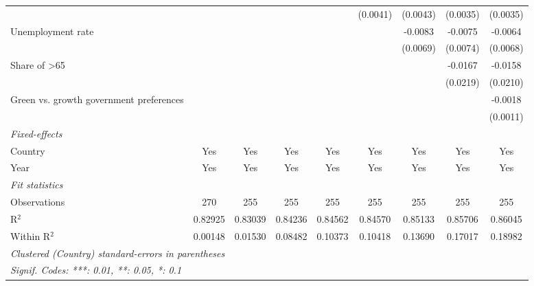\begin{table}[htbp]
\begin{tabular}{lcccccccc}
                                                                 &          &          &          &               & (0.0041)      & (0.0043)      & (0.0035)       & (0.0035)\\   
      Unemployment rate                                          &          &          &          &               &               & -0.0083       & -0.0075        & -0.0064\\   
                                                                 &          &          &          &               &               & (0.0069)      & (0.0074)       & (0.0068)\\   
      Share of >65                                               &          &          &          &               &               &               & -0.0167        & -0.0158\\   
                                                                 &          &          &          &               &               &               & (0.0219)       & (0.0210)\\   
      Green vs. growth government preferences                    &          &          &          &               &               &               &                & -0.0018\\   
                                                                 &          &          &          &               &               &               &                & (0.0011)\\   
      \midrule
      \emph{Fixed-effects}\\
      Country                                                    & Yes      & Yes      & Yes      & Yes           & Yes           & Yes           & Yes            & Yes\\  
      Year                                                       & Yes      & Yes      & Yes      & Yes           & Yes           & Yes           & Yes            & Yes\\  
      \midrule
      \emph{Fit statistics}\\
      Observations                                               & 270      & 255      & 255      & 255           & 255           & 255           & 255            & 255\\  
      R$^2$                                                      & 0.82925  & 0.83039  & 0.84236  & 0.84562       & 0.84570       & 0.85133       & 0.85706        & 0.86045\\  
      Within R$^2$                                               & 0.00148  & 0.01530  & 0.08482  & 0.10373       & 0.10418       & 0.13690       & 0.17017        & 0.18982\\  
      \midrule \midrule
      \multicolumn{9}{l}{\emph{Clustered (Country) standard-errors in parentheses}}\\
      \multicolumn{9}{l}{\emph{Signif. Codes: ***: 0.01, **: 0.05, *: 0.1}}\\
   \end{tabular}
\end{table}


